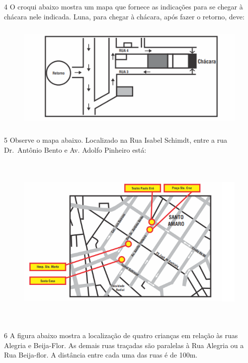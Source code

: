 
\num{4}  O croqui abaixo mostra um mapa que fornece as indicações para se
chegar à chácara nele indicada. Luna, para chegar à chácara, após fazer o retorno, deve:

\begin{figure}
\includegraphics[width=4.95347in,height=2.04653in]{./imgSAEB_6_MAT/media/image67.png}
\end{figure}


\num{5}  Observe o mapa abaixo. Localizado na Rua Isabel Schimdt, entre a rua Dr.~Antônio Bento e Av.
Adolfo Pinheiro está:

\begin{figure}
\includegraphics[width=5.90625in,height=3.34375in]{./imgSAEB_6_MAT/media/image68.png}
\end{figure}


\num{6}  A figura abaixo mostra a localização de quatro crianças em relação às
ruas Alegria e Beija-Flor. As demais ruas traçadas são paralelas à Rua
Alegria ou a Rua Beija-flor. A distância entre cada uma das ruas é de
100m.


